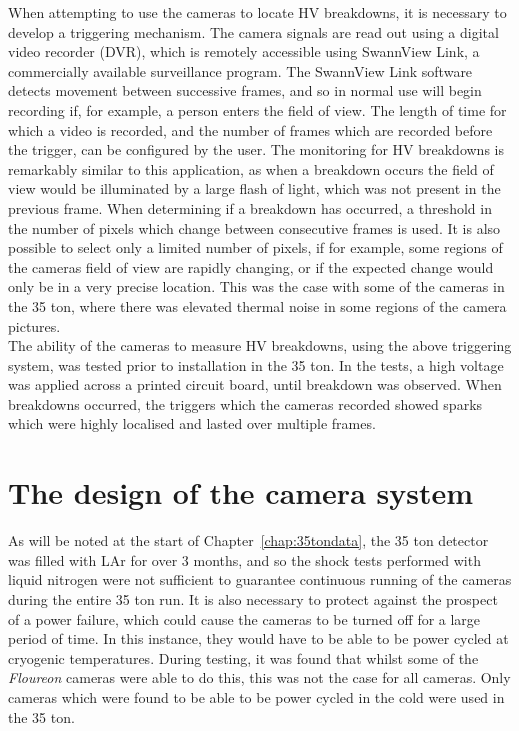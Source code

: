 When attempting to use the cameras to locate HV breakdowns, it is necessary to develop a triggering mechanism. The camera signals are read out using a digital video recorder (DVR), which is remotely accessible using SwannView Link, a commercially available surveillance program. The SwannView Link software detects movement between successive frames, and so in normal use will begin recording if, for example, a person enters the field of view. The length of time for which a video is recorded, and the number of frames which are recorded before the trigger, can be configured by the user. The monitoring for HV breakdowns is remarkably similar to this application, as when a breakdown occurs the field of view would be illuminated by a large flash of light, which was not present in the previous frame. When determining if a breakdown has occurred, a threshold in the number of pixels which change between consecutive frames is used. It is also possible to select only a limited number of pixels, if for example, some regions of the cameras field of view are rapidly changing, or if the expected change would only be in a very precise location. This was the case with some of the cameras in the 35 ton, where there was elevated thermal noise in some regions of the camera pictures. \\

The ability of the cameras to measure HV breakdowns, using the above triggering system, was tested prior to installation in the 35 ton. In the tests, a high voltage was applied across a printed circuit board, until breakdown was observed. When breakdowns occurred, the triggers which the cameras recorded showed sparks which were highly localised and lasted over multiple frames. \\

\section{The design of the camera system} \label{sec:CamDesign} %

As will be noted at the start of Chapter~\ref{chap:35tondata}, the 35 ton detector was filled with LAr for over 3 months, and so the shock tests performed with liquid nitrogen were not sufficient to guarantee continuous running of the cameras during the entire 35 ton run. It is also necessary to protect against the prospect of a power failure, which could cause the cameras to be turned off for a large period of time. In this instance, they would have to be able to be power cycled at cryogenic temperatures. During testing, it was found that whilst some of the \emph{Floureon} cameras were able to do this, this was not the case for all cameras. Only cameras which were found to be able to be power cycled in the cold were used in the 35 ton. \\

